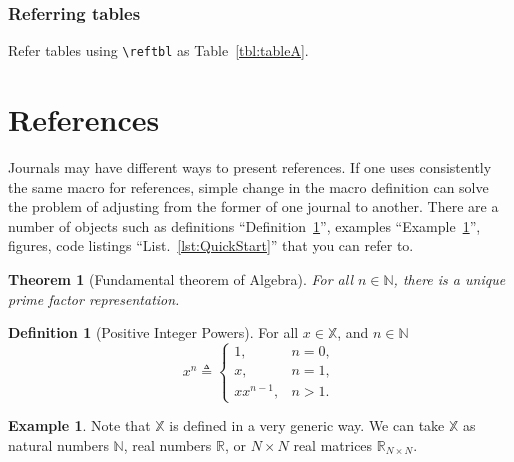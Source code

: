 \documentclass[10pt,journal,compsoc]{IEEEtran}
\newcommand{\reftbl}[1]{Table~\ref{#1}}
\newcommand{\reflst}[1]{List.~\ref{#1}}  %
\newcommand{\refdef}[1]{Definition~\ref{#1}}
\newcommand{\refexmp}[1]{Example~\ref{#1}}
\theoremstyle{plain}
\newtheorem{thm}{Theorem}[section]
\theoremstyle{definition}
\newtheorem{defn}{Definition}[section]
\newtheorem{exmp}{Example}[section]
\theoremstyle{remark}
\newcommand{\hSoX}{\mathbb{X}} %
\newcommand{\hSoN}{\mathbb{N}} %
\newcommand{\hSoR}{\mathbb{R}} %
\begin{document}
\subsubsection{Referring tables}

Refer tables using \verb!\reftbl! as \reftbl{tbl:tableA}.













\section{References}
\label{sec:References}

Journals may have different ways to present references. 
If one uses consistently the same macro for references,
simple change in the macro definition can solve 
the problem of adjusting from the former of one journal to another.
There are a number of objects such as 
definitions ``\refdef{def:PositiveIntegerPowers}'', 
examples ``\refexmp{exp:Generic}'',
figures, 
code listings ``\reflst{lst:QuickStart}''
 that you can refer to.

\begin{thm}[Fundamental theorem of Algebra]
	For all $n \in \hSoN$,
	there is a unique prime factor representation.
	\label{thm:PrimeFactorization}
\end{thm}

\begin{defn}[Positive Integer Powers]
	For all $x \in \hSoX$, and $n \in \hSoN$
	\[
		x^{n} \triangleq
		\begin{cases}
			1, 
			 &n = 0, \\
			x, 
			 &n = 1, \\
			x x^{n-1},
			 &n > 1.
		\end{cases}
	\]
	\label{def:PositiveIntegerPowers}
\end{defn}

\begin{exmp}
	\label{exp:Generic}
	Note that $\hSoX$ is defined in a very generic way.
	We can take $\hSoX$ as 
	natural numbers $\hSoN$,
	real numbers $\hSoR$, or
	$N \times N$ real matrices $\hSoR_{N \times N}$.
\end{exmp}
\end{document}
